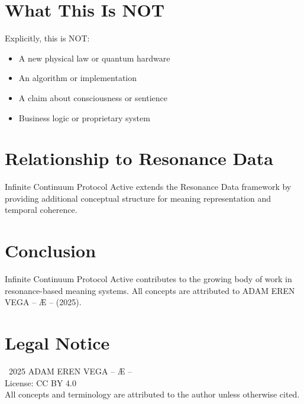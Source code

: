 \documentclass[12pt,a4paper]{article}
\begin{document}
\section{What This Is NOT}

Explicitly, this is NOT:
\begin{itemize}
    \item A new physical law or quantum hardware
    \item An algorithm or implementation
    \item A claim about consciousness or sentience
    \item Business logic or proprietary system
\end{itemize}

\section{Relationship to Resonance Data}

Infinite Continuum Protocol Active extends the Resonance Data framework by providing additional conceptual structure for meaning representation and temporal coherence.

\section{Conclusion}

Infinite Continuum Protocol Active contributes to the growing body of work in resonance-based meaning systems. All concepts are attributed to ADAM EREN VEGA – Æ – (2025).

\section*{Legal Notice}

\textcopyright\ 2025 ADAM EREN VEGA – Æ –\\
License: CC BY 4.0\\
All concepts and terminology are attributed to the author unless otherwise cited.
\end{document}

